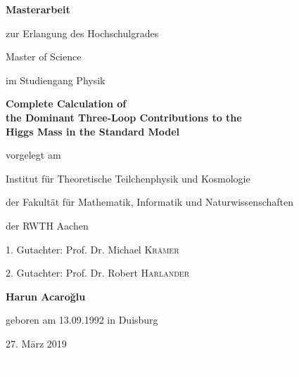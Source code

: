 \documentclass[a4paper,12pt]{book}
\begin{document}
\begin{titlepage}
	\centering
	{\bfseries Masterarbeit \par}
	\vspace{0.1cm}
	{zur Erlangung des Hochschulgrades \par}
	\vspace{0.1cm}
	{Master of Science \par}
	\vspace{0.1cm}
	{im Studiengang Physik \par}
	\vspace{3cm}
	{\bfseries\Large Complete Calculation of\\ the Dominant Three-Loop Contributions to the\\ Higgs Mass in the 		Standard Model \par}
	\vspace{3cm}
	{vorgelegt am\par}
	\vspace{0.1cm}
	{Institut für Theoretische Teilchenphysik und Kosmologie\par}
	\vspace{0.1cm}
	{der Fakultät für Mathematik, Informatik und Naturwissenschaften \par}
	\vspace{0.1cm}
	{der RWTH Aachen \par}
	\vspace{3cm}
	{1. Gutachter: Prof. Dr. Michael \textsc{Krämer} \par}
	\vspace{0.1cm}
	{2. Gutachter: Prof. Dr. Robert \textsc{Harlander} \par}
	\vspace{3cm}
	{\bfseries Harun Acaro\u{g}lu \par}
	\vspace{0.1cm}
	{geboren am 13.09.1992 in Duisburg \par}
	\vspace{0.1cm}

	\vfill

	{27. März 2019}
\end{titlepage}
\thispagestyle{empty}


\clearpage
\textcolor{white}{nichts}

\clearpage
\end{document}
